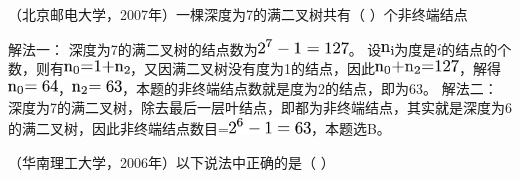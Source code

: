 \question （北京邮电大学，2007年）一棵深度为7的满二叉树共有（ ）个非终端结点
\par{}
\begin{solution}解法一：
深度为7的满二叉树的结点数为\includegraphics[width=0.94792in,height=0.16667in]{texmath/dd04ad5Cdpi7B3507D25E7-13D127}。
设\includegraphics[width=0.13542in,height=0.11458in]{texmath/fc7cb75Cdpi7B3507D7B7B5Crm7Bn7D7D_7B5Crm7Bi7D7D7D}为度是\includegraphics[width=0.05208in,height=0.11458in]{texmath/2a80255Cdpi7B3507Di}的结点的个数，则有\includegraphics[width=0.68750in,height=0.14583in]{texmath/55ffa05Cdpi7B3507D7B7B5Crm7Bn7D7D_07D7B5Crm7B3D7D7D17B5Crm7B2B7D7D7B7B5Crm7Bn7D7D_27D}，又因满二叉树没有度为1的结点，因此\includegraphics[width=0.87500in,height=0.15625in]{texmath/85230f5Cdpi7B3507D7B7B5Crm7Bn7D7D_07D7B5Crm7B2B7D7D7B7B5Crm7Bn7D7D_27D7B5Crm7B3D7D7D127}，解得\includegraphics[width=0.52083in,height=0.14583in]{texmath/3e62be5Cdpi7B3507D7B7B5Crm7Bn7D7D_07D7B5Crm7B3D647D7D}，\includegraphics[width=0.52083in,height=0.14583in]{texmath/c4bc875Cdpi7B3507D7B7B5Crm7Bn7D7D_27D7B5Crm7B3D637D7D}，本题的非终端结点数就是度为2的结点，即为63。
解法二：
深度为7的满二叉树，除去最后一层叶结点，即都为非终端结点，其实就是深度为6的满二叉树，因此非终端结点数目=\includegraphics[width=0.85417in,height=0.16667in]{texmath/076ca35Cdpi7B3507D25E6-13D63}，本题选B。
\end{solution}
\question （华南理工大学，2006年）以下说法中正确的是（ ）
\par{}
